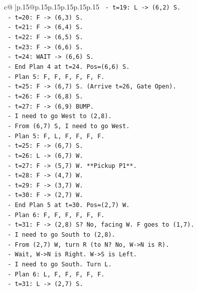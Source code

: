 \documentclass{article}
\begin{document}
{\begin{supertabular}{c@{$\;$}|p{.15\linewidth}@{}p{.15\linewidth}p{.15\linewidth}p{.15\linewidth}p{.15\linewidth}p{.15\linewidth}}
{{{\texttt{      {-} t=19: L {-}> (6,2) S.} \\
\texttt{      {-} t=20: F {-}> (6,3) S.} \\
\texttt{      {-} t=21: F {-}> (6,4) S.} \\
\texttt{      {-} t=22: F {-}> (6,5) S.} \\
\texttt{      {-} t=23: F {-}> (6,6) S.} \\
\texttt{      {-} t=24: WAIT {-}> (6,6) S.} \\
\texttt{      {-} End Plan 4 at t=24. Pos=(6,6) S.} \\
\texttt{    {-} Plan 5: F, F, F, F, F, F.} \\
\texttt{      {-} t=25: F {-}> (6,7) S. (Arrive t=26, Gate Open).} \\
\texttt{      {-} t=26: F {-}> (6,8) S.} \\
\texttt{      {-} t=27: F {-}> (6,9) BUMP.} \\
\texttt{      {-} I need to go West to (2,8).} \\
\texttt{      {-} From (6,7) S, I need to go West.} \\
\texttt{      {-} Plan 5: F, L, F, F, F, F.} \\
\texttt{        {-} t=25: F {-}> (6,7) S.} \\
\texttt{        {-} t=26: L {-}> (6,7) W.} \\
\texttt{        {-} t=27: F {-}> (5,7) W. **Pickup P1**.} \\
\texttt{        {-} t=28: F {-}> (4,7) W.} \\
\texttt{        {-} t=29: F {-}> (3,7) W.} \\
\texttt{        {-} t=30: F {-}> (2,7) W.} \\
\texttt{        {-} End Plan 5 at t=30. Pos=(2,7) W.} \\
\texttt{      {-} Plan 6: F, F, F, F, F, F.} \\
\texttt{        {-} t=31: F {-}> (2,8) S? No, facing W. F goes to (1,7).} \\
\texttt{        {-} I need to go South to (2,8).} \\
\texttt{        {-} From (2,7) W, turn R (to N? No, W{-}>N is R).} \\
\texttt{        {-} Wait, W{-}>N is Right. W{-}>S is Left.} \\
\texttt{        {-} I need to go South. Turn L.} \\
\texttt{        {-} Plan 6: L, F, F, F, F, F.} \\
\texttt{          {-} t=31: L {-}> (2,7) S.} \\
}}}
\end{supertabular}}
\end{document}
